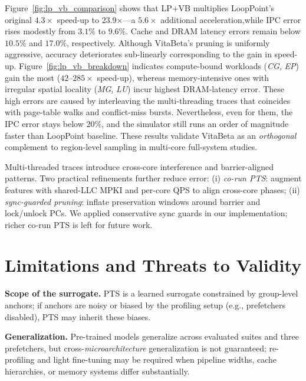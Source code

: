 Figure~\ref{fig:lp_vb_comparison} shows that \textsc{LP+VB} multiplies
LoopPoint’s original $4.3\times$ speed-up to {23.9$\times$}—a $5.6\times$ additional acceleration,while IPC error rises modestly from $3.1\%$ to {9.6\%}.  Cache and DRAM latency errors remain below $10.5\%$ and $17.0\%$,
respectively.  Although VitaBeta’s pruning is uniformly aggressive, accuracy deteriorates sub-linearly corresponding to the gain in speed-up. Figure~\ref{fig:lp_vb_breakdown} indicates compute-bound workloads
(\textit{CG}, \textit{EP}) gain the most ($42$–$285\times$ speed-up),
whereas memory-intensive ones with irregular spatial locality (\textit{MG}, \textit{LU}) incur 
highest DRAM-latency error.  These high errors are caused by interleaving the multi-threading traces that coincides with page-table walks and conflict-miss bursts. Nevertheless, even for them, the IPC error stays below 20\%, and the simulator still runs an order of magnitude faster than  LoopPoint baseline. 
These results validate VitaBeta as an \emph{orthogonal}
complement to region-level sampling in multi-core full-system studies.  

Multi-threaded traces introduce cross-core interference and barrier-aligned patterns. Two practical refinements further reduce error: (i) \emph{co-run PTS}: augment features with shared-LLC MPKI and per-core QPS to align cross-core phases; (ii) \emph{sync-guarded pruning}: inflate preservation windows around barrier and lock/unlock PCs. We applied conservative sync guards in our implementation; richer co-run PTS is left for future work.

\section{Limitations and Threats to Validity}
\label{sec:limitations}
\textbf{Scope of the surrogate.} PTS is a learned surrogate constrained by group-level anchors; if anchors are noisy or biased by the profiling setup (e.g., prefetchers disabled), PTS may inherit these biases. 

\textbf{Generalization.} Pre-trained models generalize across evaluated suites and three prefetchers, but cross-\emph{microarchitecture} generalization is not guaranteed; re-profiling and light fine-tuning may be required when pipeline widths, cache hierarchies, or memory systems differ substantially. 

